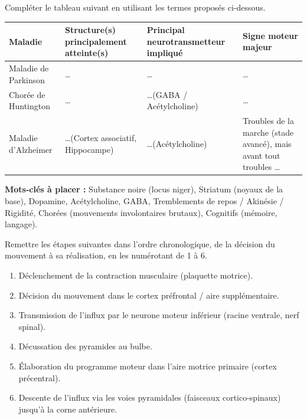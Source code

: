 \documentclass[11pt]{article}
\begin{document}
\begin{exercice}
Compléter le tableau suivant en utilisant les termes proposés ci-dessous.
\vspace{0.2cm}
\begin{center}
\begin{tabular}{|p{2.5cm}|p{3.5cm}|p{3.5cm}|p{3.5cm}|}
\hline
\textbf{Maladie} & \textbf{Structure(s) principalement atteinte(s)} & \textbf{Principal neurotransmetteur impliqué} & \textbf{Signe moteur majeur} \\
\hline
Maladie de Parkinson & \ldots & \ldots & \ldots \\
\hline
Chorée de Huntington & \ldots & \ldots (GABA / Acétylcholine) & \ldots \\
\hline
Maladie d'Alzheimer & \ldots (Cortex associatif, Hippocampe) & \ldots (Acétylcholine) & Troubles de la marche (stade avancé), mais avant tout troubles \ldots \\
\hline
\end{tabular}
\end{center}
\vspace{0.2cm}
\textbf{Mots-clés à placer :} Substance noire (locus niger), Striatum (noyaux de la base), Dopamine, Acétylcholine, GABA, Tremblements de repos / Akinésie / Rigidité, Chorées (mouvements involontaires brutaux), Cognitifs (mémoire, langage).
\end{exercice}

\begin{exercice}
Remettre les étapes suivantes dans l'ordre chronologique, de la décision du mouvement à sa réalisation, en les numérotant de 1 à 6.
\begin{enumerate}
    \item Déclenchement de la contraction musculaire (plaquette motrice).
    \item Décision du mouvement dans le cortex préfrontal / aire supplémentaire.
    \item Transmission de l'influx par le neurone moteur inférieur (racine ventrale, nerf spinal).
    \item Décussation des pyramides au bulbe.
    \item Élaboration du programme moteur dans l'aire motrice primaire (cortex précentral).
    \item Descente de l'influx via les voies pyramidales (faisceaux cortico-spinaux) jusqu'à la corne antérieure.
\end{enumerate}
\end{exercice}
\end{document}
